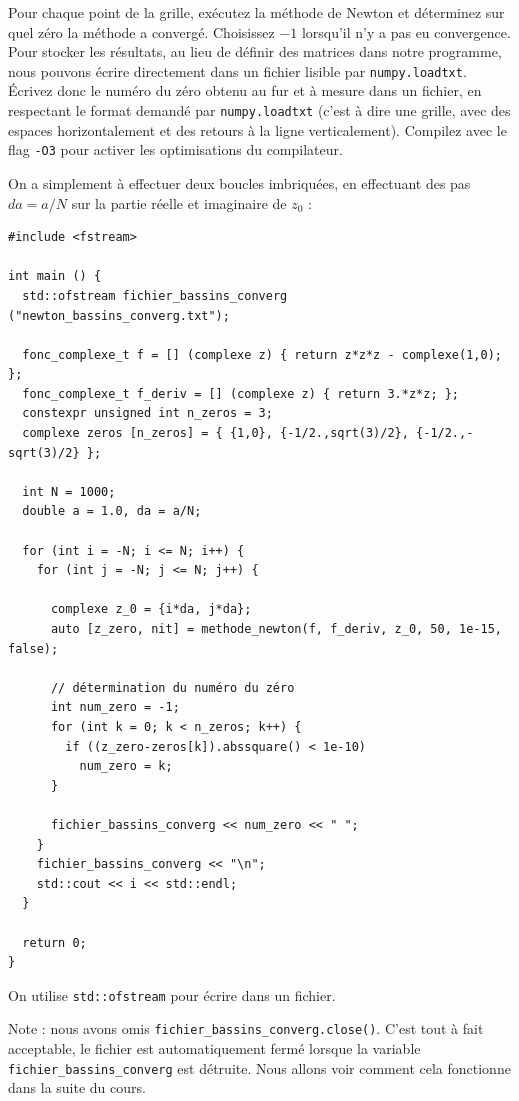 \documentclass{book}
\newcommand{\inline}[1]{\texttt{#1}}
\begin{document}
Pour chaque point de la grille, exécutez la méthode de Newton et déterminez sur quel zéro la méthode a convergé. Choisissez $-1$ lorsqu'il n'y a pas eu convergence. Pour stocker les résultats, au lieu de définir des matrices dans notre programme, nous pouvons écrire directement dans un fichier lisible par \texttt{numpy.loadtxt}. Écrivez donc le numéro du zéro obtenu au fur et à mesure dans un fichier, en respectant le format demandé par \texttt{numpy.loadtxt} (c'est à dire une grille, avec des espaces horizontalement et des retours à la ligne verticalement). Compilez avec le flag \texttt{-O3} pour activer les optimisations du compilateur.\\

\begin{correction}
On a simplement à effectuer deux boucles imbriquées, en effectuant des pas $da=a/N$ sur la partie réelle et imaginaire de $z_0$ :
\begin{verbatim}
#include <fstream>

int main () {
  std::ofstream fichier_bassins_converg ("newton_bassins_converg.txt");

  fonc_complexe_t f = [] (complexe z) { return z*z*z - complexe(1,0); };
  fonc_complexe_t f_deriv = [] (complexe z) { return 3.*z*z; };
  constexpr unsigned int n_zeros = 3;
  complexe zeros [n_zeros] = { {1,0}, {-1/2.,sqrt(3)/2}, {-1/2.,-sqrt(3)/2} };

  int N = 1000;
  double a = 1.0, da = a/N;

  for (int i = -N; i <= N; i++) {
    for (int j = -N; j <= N; j++) {

      complexe z_0 = {i*da, j*da};
      auto [z_zero, nit] = methode_newton(f, f_deriv, z_0, 50, 1e-15, false);

      // détermination du numéro du zéro
      int num_zero = -1;
      for (int k = 0; k < n_zeros; k++) {
        if ((z_zero-zeros[k]).abssquare() < 1e-10)
          num_zero = k;
      }

      fichier_bassins_converg << num_zero << " ";
    }
    fichier_bassins_converg << "\n";
    std::cout << i << std::endl;
  }

  return 0;
}
\end{verbatim}

On utilise \inline{std::ofstream} pour écrire dans un fichier.

Note : nous avons omis \inline{fichier_bassins_converg.close()}. C'est tout à fait acceptable, le fichier est automatiquement fermé lorsque la variable \inline{fichier_bassins_converg} est détruite. Nous allons voir comment cela fonctionne dans la suite du cours.

\end{correction}
\end{document}
